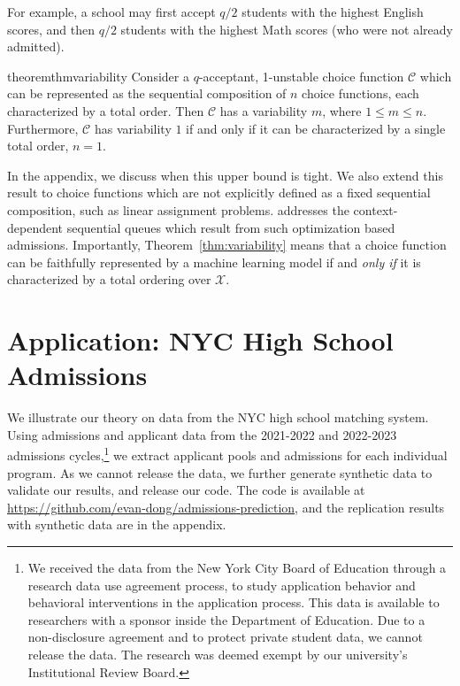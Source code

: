 \documentclass[letterpaper]{article}
\newcommand{\calX}{\mathcal{X}}
\begin{document}
For example, a school may first accept $q/2$ students with the highest English scores, and then $q/2$ students with the highest Math scores (who were not already admitted).

\begin{restatable}{theorem}{thmvariability}
\label{thm:variability}
Consider a $q$-acceptant, 1-unstable choice function $\mathcal C$ which
can be represented as the sequential composition of $n$ choice functions, each characterized by a total order.
Then $\mathcal C$ has a variability  $m$, where $1 \leq m \leq n$. Furthermore, $\mathcal C$ has variability $1$ if and only if it can be characterized by a single total order, $n=1$.
\end{restatable}
In the appendix, we discuss when this upper bound is tight. We also extend this result to choice functions which are not explicitly defined as a fixed sequential composition, such as linear assignment problems.
 addresses the context-dependent sequential queues which result from such optimization based admissions.
Importantly, Theorem~\ref{thm:variability} means that a choice function can be faithfully represented by a machine learning model if and \emph{only if} it is characterized by a total ordering over $\calX$.

\section{Application: NYC High School Admissions}\label{sec:empirics}

We illustrate our theory on data from the NYC high school matching system. Using admissions and applicant data from the 2021-2022 and 2022-2023 admissions cycles,\footnote{We received the data from the New York City Board of Education through a research data use agreement process, to study application behavior and behavioral interventions in the application process. This data is available to researchers with a sponsor inside the Department of Education. Due to a non-disclosure agreement and to protect private student data, we cannot release the data. The research was deemed exempt by our university's Institutional Review Board.} we extract applicant pools and admissions for each individual program.
As we cannot release the data, we further generate synthetic data to validate our results, and release our code. The code is available at \url{https://github.com/evan-dong/admissions-prediction}, and the replication results with synthetic data are in the appendix.
\end{document}
